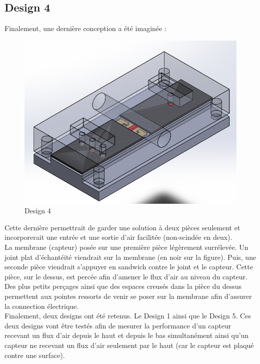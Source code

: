 \subsection{Design 4}
Finalement, une dernière conception a été imaginée :
\begin{figure}[H]
    \centering
    \includegraphics[scale = 0.4]{images/Design5_int_caoutch.png}
    \caption{Design 4}
    \label{fig:design5}
\end{figure}

Cette dernière permettrait de garder une solution à deux pièces seulement et incorporerait une entrée et une sortie d'air facilitée
(non-scindée en deux).\\
La membrane (capteur) posée sur une première pièce légèrement surrélevée. Un joint plat d'échantéité viendrait sur la membrane (en noir
sur la figure). Puis, une seconde pièce viendrait s'appuyer en sandwich contre le joint et le capteur. Cette pièce, sur le dessus, est
percée afin d'amener le flux d'air au niveau du capteur. Des plus petits perçages ainsi que des espaces creusés dans la pièce du dessus
permettent aux pointes ressorts de venir se poser sur la membrane afin d'assurer la connection électrique.\\

Finalement, deux designs ont été retenus. Le Design 1 ainsi que le Design 5. Ces deux designs vont être testés afin de mesurer la
performance d'un capteur recevant un flux d'air depuis le haut et depuis le bas simultanément ainsi qu'un capteur ne recevant un flux
d'air seulement par le haut (car le capteur est plaqué contre une surface).